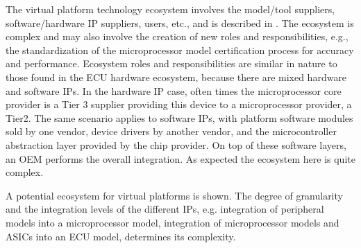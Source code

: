 The virtual platform technology ecosystem involves the model/tool suppliers, software/hardware IP suppliers, users, etc., and is described in \cite{Knauss2014d}.
The ecosystem is complex and may also involve the creation of new roles and responsibilities,
e.g., the standardization of the microprocessor model certification process  for accuracy and performance.
Ecosystem roles and responsibilities are similar in nature to those found in the ECU hardware ecosystem, because there are mixed hardware and software IPs.
In the hardware IP case, often times the microprocessor core provider is a Tier 3 supplier providing this device to a microprocessor provider, a Tier2.
The same scenario applies to software IPs, with platform software modules sold by one vendor, device drivers by another vendor, and the microcontroller abstraction layer provided by the chip provider.
On top of these software layers, an OEM performs the overall integration. As expected the ecosystem here is quite complex.

A potential ecosystem for virtual platforms is shown.
The degree of granularity and the integration levels of the different IPs,
e.g. integration of peripheral models into a microprocessor model, integration of microprocessor models and ASICs into an ECU model,
determines its complexity.
